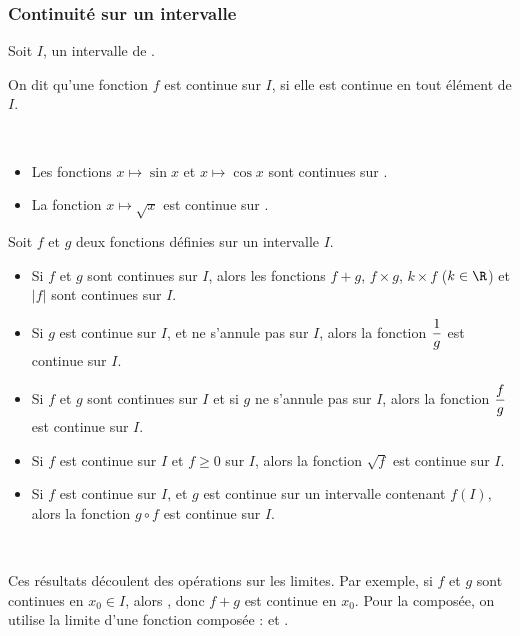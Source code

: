 \subsubsection{Continuité sur un intervalle}%
\begin{definition}
Soit $I$, un intervalle de \R.
\par On dit qu'une fonction $f$ est continue sur $I$, si elle est continue en tout élément de $I$.
\end{definition}\\
\begin{exemple}[s]
\begin{itemize}
	\item Les fonctions $x\longmapsto \sin x$ et $x\longmapsto \cos x$ sont continues sur \R.
	\item La fonction $x\longmapsto \sqrt{x}$ est continue sur .
\end{itemize}
\end{exemple}
\begin{propriete}[s]
	\par Soit $f$ et $g$ deux fonctions définies sur un intervalle $I$.
	\begin{itemize}
		\item Si $f$ et $g$ sont continues sur $I$, alors les fonctions $f+g$, $f\times g$, $k\times f$ ($k\in \R$) et $\lvert f\rvert$ sont continues sur $I$.
		\item Si $g$ est continue sur $I$, et ne s'annule pas sur $I$, alors la fonction $\dfrac{1}{g}$ est continue sur $I$.
		\item Si $f$ et $g$ sont continues sur $I$ et si $g$ ne s'annule pas sur $I$, alors la fonction $\dfrac{f}{g}$ est continue sur $I$.
\item Si $f$ est continue sur $I$ et $f\geq 0$ sur $I$, alors la fonction $\sqrt{f}$ est continue sur $I$.
\item Si $f$ est continue sur $I$, et $g$ est continue sur un intervalle contenant $f(I)$, alors la fonction $g\circ f$ est continue sur $I$.
\end{itemize}
\end{propriete}\\
\begin{preuve}
Ces résultats découlent des opérations sur les limites. Par exemple, si $f$ et $g$ sont continues en $x_0\in I$, alors , donc $f+g$ est continue en $x_0$. Pour la composée, on utilise la limite d'une fonction composée :  et .
\end{preuve}
